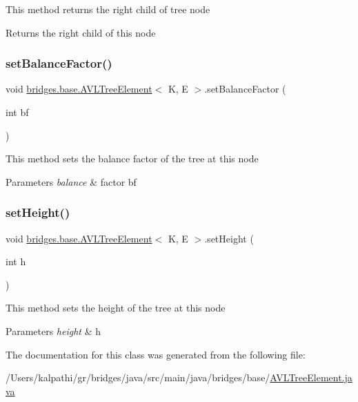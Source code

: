 This method returns the right child of tree node

\begin{DoxyReturn}{Returns}
the right child of this node 
\end{DoxyReturn}
\mbox{\label{classbridges_1_1base_1_1_a_v_l_tree_element_a0dc3c83e750cc39535afb08ea92f6c98}} 
\subsubsection{\texorpdfstring{setBalanceFactor()}{setBalanceFactor()}}
{\footnotesize\ttfamily void \mbox{\hyperlink{classbridges_1_1base_1_1_a_v_l_tree_element}{bridges.\+base.\+A\+V\+L\+Tree\+Element}}$<$ K, E $>$.set\+Balance\+Factor (\begin{DoxyParamCaption}\item[{int}]{bf }\end{DoxyParamCaption})}

This method sets the balance factor of the tree at this node


\begin{DoxyParams}{Parameters}
{\em balance} & factor bf \\
\hline
\end{DoxyParams}
\mbox{\label{classbridges_1_1base_1_1_a_v_l_tree_element_ac42b744989ed7e18dcbd52980e674b33}} 
\subsubsection{\texorpdfstring{setHeight()}{setHeight()}}
{\footnotesize\ttfamily void \mbox{\hyperlink{classbridges_1_1base_1_1_a_v_l_tree_element}{bridges.\+base.\+A\+V\+L\+Tree\+Element}}$<$ K, E $>$.set\+Height (\begin{DoxyParamCaption}\item[{int}]{h }\end{DoxyParamCaption})}

This method sets the height of the tree at this node


\begin{DoxyParams}{Parameters}
{\em height} & h \\
\hline
\end{DoxyParams}


The documentation for this class was generated from the following file\+:\begin{DoxyCompactItemize}
\item 
/\+Users/kalpathi/gr/bridges/java/src/main/java/bridges/base/\mbox{\hyperlink{_a_v_l_tree_element_8java}{A\+V\+L\+Tree\+Element.\+java}}\end{DoxyCompactItemize}
